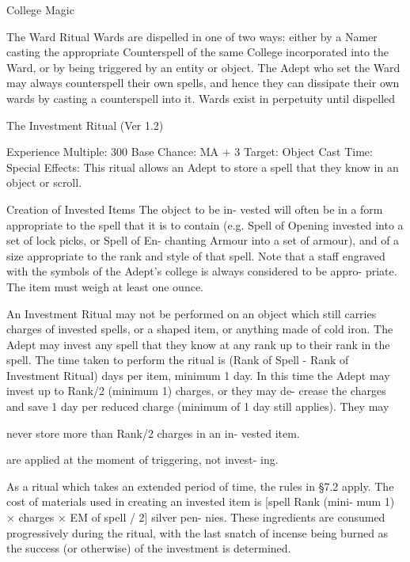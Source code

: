 \begin{Chapter}{College Magic}
\begin{ritual}{The Ward Ritual}
Wards are dispelled in one of two ways: either by a 
Namer  casting  the  appropriate  Counterspell  of  the 
same  College  incorporated  into  the  Ward,  or  by 
being  triggered  by  an  entity  or  object.  The  Adept 
who  set  the  Ward  may  always  counterspell  their 
own spells, and hence they can dissipate their own 
wards by casting a counterspell into it. Wards exist 
in perpetuity until dispelled
\end{ritual}

\begin{ritual}{The Investment Ritual (Ver 1.2)}

Experience Multiple: 300 
Base Chance: MA + 3%
Target: Object 
Cast Time: Special 
Effects: This ritual allows an Adept to store a spell 
that they know in an object or scroll. 

Creation  of  Invested  Items  The  object  to  be  in-
vested  will  often  be  in  a  form  appropriate  to  the 
spell  that  it  is  to  contain  (e.g.  Spell  of  Opening 
invested  into  a  set  of  lock  picks,  or  Spell  of  En-
chanting  Armour  into  a  set  of  armour),  and  of  a 
size appropriate to the rank and style of that spell. 
Note that a staff engraved with the symbols  of the 
Adept’s  college  is  always  considered  to  be  appro-
priate. The item must weigh at least one ounce. 

An Investment Ritual may not be performed on an 
object which still carries charges of invested spells, 
or  a  shaped  item,  or  anything  made  of  cold  iron. 
The  Adept  may  invest  any  spell  that they  know  at 
any  rank  up  to  their  rank  in  the  spell.  The  time 
taken to perform the ritual is (Rank of Spell - Rank 
of  Investment  Ritual)  days  per  item,  minimum  1 
day.  In  this  time  the  Adept  may  invest  up  to 
Rank/2  (minimum  1)  charges,  or  they  may  de-
crease  the  charges  and  save  1  day  per  reduced 
charge (minimum of 1 day still applies). They may 

never  store  more  than  Rank/2  charges  in  an  in-
vested item. 

are applied at the moment of triggering, not invest-
ing. 

As a ritual which takes an extended period of time, 
the rules in §7.2 apply. The cost of  materials used 
in  creating  an  invested  item  is  [spell  Rank  (mini-
mum  1)  ×  charges  ×  EM  of  spell  /  2]  silver  pen-
nies. These ingredients are consumed progressively 
during  the  ritual,  with  the  last  snatch  of  incense 
being  burned  as  the  success  (or  otherwise)  of  the 
investment is determined. 


\end{ritual}
\end{Chapter}

